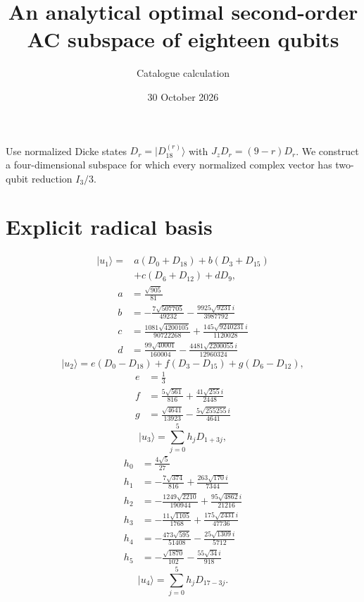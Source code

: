 \documentclass[11pt]{article}
\begin{document}
\title{An analytical optimal second-order AC subspace of eighteen qubits}
\author{Catalogue calculation}\date{30 October 2026}\maketitle
Use normalized Dicke states $D_r=|D_{18}^{(r)}\rangle$ with
$J_zD_r=(9-r)D_r$. We construct a four-dimensional subspace for which every
normalized complex vector has two-qubit reduction $I_3/3$.

\section{Explicit radical basis}
\[
\begin{aligned}|u_1\rangle={}&a(D_0+D_{18})+b(D_3+D_{15})\\&+c(D_6+D_{12})+dD_9,\end{aligned}
\]
\[
\begin{aligned}a&=\frac{\sqrt{905}}{81}\\b&=- \frac{7 \sqrt{507705}}{49232} - \frac{9925 \sqrt{9231} i}{3987792}\\c&=\frac{1081 \sqrt{4200105}}{90722268} + \frac{145 \sqrt{9240231} i}{1120028}\\d&=\frac{99 \sqrt{40001}}{160004} - \frac{4481 \sqrt{2200055} i}{12960324}\end{aligned}
\]
\[
|u_2\rangle=e(D_0-D_{18})+f(D_3-D_{15})+g(D_6-D_{12}),
\]
\[
\begin{aligned}e&=\frac{1}{3}\\f&=\frac{5 \sqrt{561}}{816} + \frac{41 \sqrt{255} i}{2448}\\g&=\frac{\sqrt{4641}}{13923} - \frac{5 \sqrt{255255} i}{4641}\end{aligned}
\]
\[
|u_3\rangle=\sum_{j=0}^5h_jD_{1+3j},
\]
\[
\begin{aligned}h_0&=\frac{4 \sqrt{5}}{27}\\h_1&=- \frac{7 \sqrt{374}}{816} + \frac{263 \sqrt{170} i}{7344}\\h_2&=- \frac{1249 \sqrt{2210}}{190944} + \frac{95 \sqrt{4862} i}{21216}\\h_3&=- \frac{11 \sqrt{1105}}{1768} + \frac{175 \sqrt{2431} i}{47736}\\h_4&=- \frac{473 \sqrt{595}}{51408} - \frac{25 \sqrt{1309} i}{5712}\\h_5&=- \frac{\sqrt{1870}}{102} - \frac{55 \sqrt{34} i}{918}\end{aligned}
\]
\[
|u_4\rangle=\sum_{j=0}^5h_jD_{17-3j}.
\]
\end{document}
